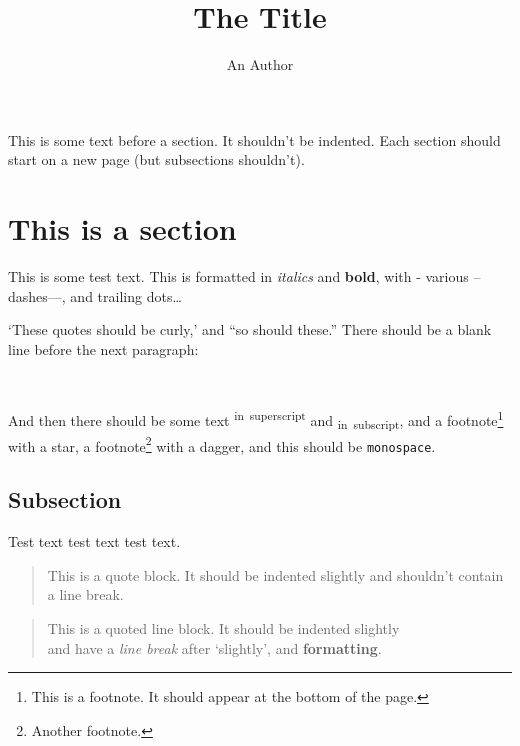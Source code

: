 \documentclass[
  12pt,
  a4paper,
]{article}
\title{The Title}
\author{An Author}
\date{}
\begin{document}
\maketitle

\frenchspacing

\newcommand{\sectionbreak}{\clearpage}


\makeatletter
\@afterindentfalse
\@afterheading
\makeatother

This is some text before a section. It shouldn't be indented. Each
section should start on a new page (but subsections shouldn't).

\hypertarget{__h1_1}{%
\section{This is a section}\label{__h1_1}}

This is some test text. This is formatted in \emph{italics} and
\textbf{bold}, with - various -- dashes---, and trailing dots\ldots{}

`These quotes should be curly,' and ``so should these.'' There should be
a blank line before the next paragraph:

~

\makeatletter
\@afterindentfalse
\@afterheading
\makeatother

And then there should be some text \textsuperscript{in~superscript} and
\textsubscript{in~subscript}, and a footnote\footnote{This is a
  footnote. It should appear at the bottom of the page.} with a star, a
footnote\footnote{Another footnote.} with a dagger, and this should be
\texttt{monospace}.

\hypertarget{__h2_1}{%
\subsection{Subsection}\label{__h2_1}}

Test text test text test text.

\begin{quote}
This is a quote block. It should be indented slightly and shouldn't
contain a line break.
\end{quote}

\begin{quote}
This is a quoted line block. It should be indented slightly\\
and have a \emph{line break} after `slightly', and \textbf{formatting}.
\end{quote}
\end{document}
